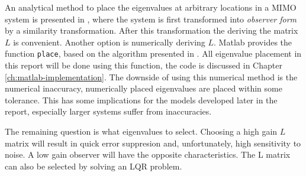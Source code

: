 An analytical method to place the eigenvalues at arbitrary locations in a MIMO system is presented in \cite[Section 4.2 B]{Antsaklis2006LinearSystems}, where the system is first transformed into \textit{observer form} by a similarity transformation. After this transformation the deriving the matrix $L$ is convenient. Another option is numerically deriving $L$. Matlab provides the function \texttt{place}, based on the algorithm presented in \cite{Kautsky1985RobustFeedback}. All eigenvalue placement in this report will be done using this function, the code is discussed in Chapter \ref{ch:matlab-implementation}. The downside of using this numerical method is the numerical inaccuracy, numerically placed eigenvalues are placed within some tolerance. This has some implications for the models developed later in the report, especially larger systems suffer from inaccuracies.

The remaining question is what eigenvalues to select. Choosing a high gain $L$ matrix will result in quick error suppresion and, unfortunately, high sensitivity to noise. A low gain observer will have the opposite characteristics. The L matrix can also be selected by solving an LQR problem\cite{Buchi2010StateExamples}.



